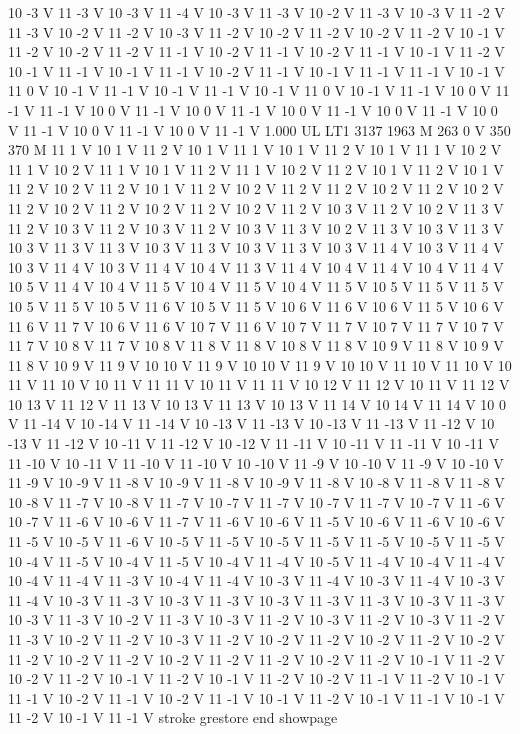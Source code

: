 {10 -3 V
11 -3 V
10 -3 V
11 -4 V
10 -3 V
11 -3 V
10 -2 V
11 -3 V
10 -3 V
11 -2 V
11 -3 V
10 -2 V
11 -2 V
10 -3 V
11 -2 V
10 -2 V
11 -2 V
10 -2 V
11 -2 V
10 -1 V
11 -2 V
10 -2 V
11 -2 V
11 -1 V
10 -2 V
11 -1 V
10 -2 V
11 -1 V
10 -1 V
11 -2 V
10 -1 V
11 -1 V
10 -1 V
11 -1 V
10 -2 V
11 -1 V
10 -1 V
11 -1 V
11 -1 V
10 -1 V
11 0 V
10 -1 V
11 -1 V
10 -1 V
11 -1 V
10 -1 V
11 0 V
10 -1 V
11 -1 V
10 0 V
11 -1 V
11 -1 V
10 0 V
11 -1 V
10 0 V
11 -1 V
10 0 V
11 -1 V
10 0 V
11 -1 V
10 0 V
11 -1 V
10 0 V
11 -1 V
10 0 V
11 -1 V
1.000 UL
LT1
3137 1963 M
263 0 V
350 370 M
11 1 V
10 1 V
11 2 V
10 1 V
11 1 V
10 1 V
11 2 V
10 1 V
11 1 V
10 2 V
11 1 V
10 2 V
11 1 V
10 1 V
11 2 V
11 1 V
10 2 V
11 2 V
10 1 V
11 2 V
10 1 V
11 2 V
10 2 V
11 2 V
10 1 V
11 2 V
10 2 V
11 2 V
11 2 V
10 2 V
11 2 V
10 2 V
11 2 V
10 2 V
11 2 V
10 2 V
11 2 V
10 2 V
11 2 V
10 3 V
11 2 V
10 2 V
11 3 V
11 2 V
10 3 V
11 2 V
10 3 V
11 2 V
10 3 V
11 3 V
10 2 V
11 3 V
10 3 V
11 3 V
10 3 V
11 3 V
11 3 V
10 3 V
11 3 V
10 3 V
11 3 V
10 3 V
11 4 V
10 3 V
11 4 V
10 3 V
11 4 V
10 3 V
11 4 V
10 4 V
11 3 V
11 4 V
10 4 V
11 4 V
10 4 V
11 4 V
10 5 V
11 4 V
10 4 V
11 5 V
10 4 V
11 5 V
10 4 V
11 5 V
10 5 V
11 5 V
11 5 V
10 5 V
11 5 V
10 5 V
11 6 V
10 5 V
11 5 V
10 6 V
11 6 V
10 6 V
11 5 V
10 6 V
11 6 V
11 7 V
10 6 V
11 6 V
10 7 V
11 6 V
10 7 V
11 7 V
10 7 V
11 7 V
10 7 V
11 7 V
10 8 V
11 7 V
10 8 V
11 8 V
11 8 V
10 8 V
11 8 V
10 9 V
11 8 V
10 9 V
11 8 V
10 9 V
11 9 V
10 10 V
11 9 V
10 10 V
11 9 V
10 10 V
11 10 V
11 10 V
10 11 V
11 10 V
10 11 V
11 11 V
10 11 V
11 11 V
10 12 V
11 12 V
10 11 V
11 12 V
10 13 V
11 12 V
11 13 V
10 13 V
11 13 V
10 13 V
11 14 V
10 14 V
11 14 V
10 0 V
11 -14 V
10 -14 V
11 -14 V
10 -13 V
11 -13 V
10 -13 V
11 -13 V
11 -12 V
10 -13 V
11 -12 V
10 -11 V
11 -12 V
10 -12 V
11 -11 V
10 -11 V
11 -11 V
10 -11 V
11 -10 V
10 -11 V
11 -10 V
11 -10 V
10 -10 V
11 -9 V
10 -10 V
11 -9 V
10 -10 V
11 -9 V
10 -9 V
11 -8 V
10 -9 V
11 -8 V
10 -9 V
11 -8 V
10 -8 V
11 -8 V
11 -8 V
10 -8 V
11 -7 V
10 -8 V
11 -7 V
10 -7 V
11 -7 V
10 -7 V
11 -7 V
10 -7 V
11 -6 V
10 -7 V
11 -6 V
10 -6 V
11 -7 V
11 -6 V
10 -6 V
11 -5 V
10 -6 V
11 -6 V
10 -6 V
11 -5 V
10 -5 V
11 -6 V
10 -5 V
11 -5 V
10 -5 V
11 -5 V
11 -5 V
10 -5 V
11 -5 V
10 -4 V
11 -5 V
10 -4 V
11 -5 V
10 -4 V
11 -4 V
10 -5 V
11 -4 V
10 -4 V
11 -4 V
10 -4 V
11 -4 V
11 -3 V
10 -4 V
11 -4 V
10 -3 V
11 -4 V
10 -3 V
11 -4 V
10 -3 V
11 -4 V
10 -3 V
11 -3 V
10 -3 V
11 -3 V
10 -3 V
11 -3 V
11 -3 V
10 -3 V
11 -3 V
10 -3 V
11 -3 V
10 -2 V
11 -3 V
10 -3 V
11 -2 V
10 -3 V
11 -2 V
10 -3 V
11 -2 V
11 -3 V
10 -2 V
11 -2 V
10 -3 V
11 -2 V
10 -2 V
11 -2 V
10 -2 V
11 -2 V
10 -2 V
11 -2 V
10 -2 V
11 -2 V
10 -2 V
11 -2 V
11 -2 V
10 -2 V
11 -2 V
10 -1 V
11 -2 V
10 -2 V
11 -2 V
10 -1 V
11 -2 V
10 -1 V
11 -2 V
10 -2 V
11 -1 V
11 -2 V
10 -1 V
11 -1 V
10 -2 V
11 -1 V
10 -2 V
11 -1 V
10 -1 V
11 -2 V
10 -1 V
11 -1 V
10 -1 V
11 -2 V
10 -1 V
11 -1 V
stroke
grestore
end
showpage
}
